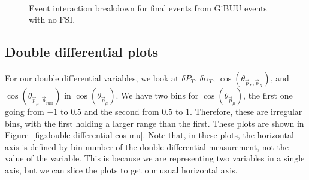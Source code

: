 \documentclass{article}
\newcommand{\vm}{\vec{p}_\mu}
\newcommand{\vlp}{\vec{p}_L}
\newcommand{\vrp}{\vec{p}_R}
\newcommand{\vtp}{\vec{p}_{\text{sum}}}
\begin{document}
\begin{figure}
     \\
    \caption{Event interaction breakdown for final events from GiBUU events with no FSI.}
    \label{fig:gibuu-no-fsi}
\end{figure}

\subsection{Double differential plots}

For our double differential variables, we look at $\delta P_T$, $\delta \alpha_T$, $\cos\left(\theta_{\vlp,\vrp}\right)$, 
and $\cos\left(\theta_{\vm,\vtp}\right)$ in $\cos(\theta_{\vec{p}_{\mu}})$. We have two bins for $\cos(\theta_{\vec{p}_{\mu}})$, the first one 
going from $-1$ to $0.5$ and the second from $0.5$ to $1$. Therefore, these are irregular bins, with the first 
holding a larger range than the first. These plots are shown in Figure~\ref{fig:double-differential-cos-mu}. Note that, 
in these plots, the horizontal axis is defined by bin number of the double differential measurement, not the value of the
variable. This is because we are representing two variables in a single axis, but we can slice the plots to get our usual 
horizontal axis.
\end{document}

